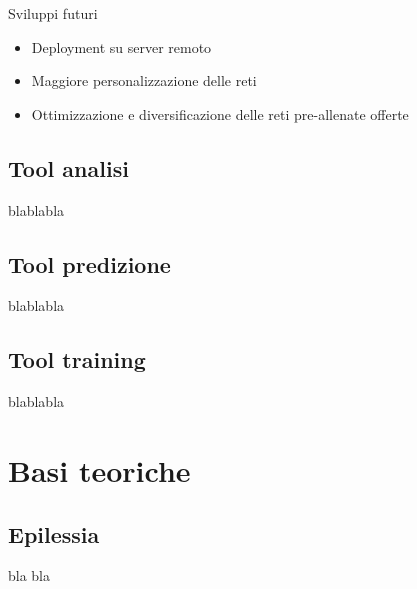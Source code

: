 \documentclass[xcolor=x11names,compress, 
					handout %
]{beamer}
\theoremstyle{definition} \newtheorem{esempio}{Esempio}
\theoremstyle{definition}
\begin{document}
		\begin{frame}{Sviluppi futuri}
			\begin{itemize}
				\item Deployment su server remoto\pause
				\item Maggiore personalizzazione delle reti \pause
				\item Ottimizzazione e diversificazione delle reti pre-allenate offerte
			\end{itemize}
		\end{frame}
		
	\subsection{Tool analisi}
		\begin{frame}{\subsecname}
			blablabla
		\end{frame}
	
	\subsection{Tool predizione}
		\begin{frame}{\subsecname}
			blablabla
		\end{frame}
	
	\subsection{Tool training}
		\begin{frame}{\subsecname}
			blablabla
		\end{frame}


\section{Basi teoriche}
	\subsection{Epilessia}
		\begin{frame}{\subsecname}
			bla bla
		\end{frame}
	
\end{document}
